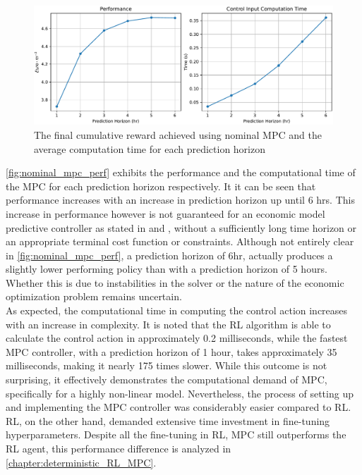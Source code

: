 \begin{figure}[H]
	\centering
	\includegraphics[width=\textwidth]{figures/mpc_nominal.pdf}
	\caption{The final cumulative reward achieved using nominal MPC and the average computation time for each prediction horizon}
	\label{fig:nominal_mpc_perf}
\end{figure}

\autoref{fig:nominal_mpc_perf} exhibits the performance and the computational time of the MPC for each prediction horizon respectively. It it can be seen that performance increases with an increase in prediction horizon up until 6 hrs. This increase in performance however is not guaranteed for an economic model predictive controller as stated in \cite{ellisTutorialReviewEconomic2014}  and \cite{amritEconomicOptimizationUsing2011}, without a sufficiently long time horizon or an appropriate terminal cost function or constraints. Although not entirely clear in \autoref{fig:nominal_mpc_perf}, a prediction horizon of 6hr, actually produces a slightly lower performing policy than with a prediction horizon of 5 hours. Whether this is due to instabilities in the solver or the nature of the economic optimization problem remains uncertain. \\
As expected, the computational time in computing the control action increases with an increase in complexity. It is noted that the RL algorithm is able to calculate the control action in approximately 0.2 milliseconds, while the fastest MPC controller, with a prediction horizon of 1 hour, takes approximately 35 milliseconds, making it nearly 175 times slower.  While this outcome is not surprising, it effectively demonstrates the computational demand of MPC, specifically for a highly non-linear model. Nevertheless, the process of setting up and implementing the MPC controller was considerably easier compared to RL. RL, on the other hand, demanded extensive time investment in fine-tuning hyperparameters. Despite all the fine-tuning in RL, MPC still outperforms the RL agent, this performance difference is analyzed in \autoref{chapter:deterministic_RL_MPC}. 

